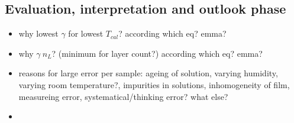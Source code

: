 \subsection{Evaluation, interpretation and outlook phase}
\label{sec:phase4}
\begin{itemize}
    \item why lowest $\gamma$ for lowest $T_{cal}$? according which eq? emma? 
    \item why $\gamma ~ n_L$? (minimum for layer count?) according which eq? emma? 
    \item reasons for large error per sample: ageing of solution, varying humidity, varying room temperature?, impurities in solutions, inhomogeneity of film, measureing error, systematical/thinking error? what else? 
    \item {} 
\end{itemize}
\fi


